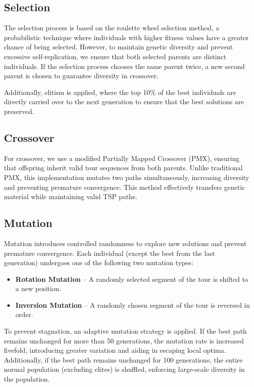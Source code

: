 \documentclass{article}
\begin{document}
\subsection{Selection}
The selection process is based on the roulette wheel selection method, a probabilistic technique where individuals with higher fitness values have a greater chance of being selected. However, to maintain genetic diversity and prevent excessive self-replication, we ensure that both selected parents are distinct individuals. If the selection process chooses the same parent twice, a new second parent is chosen to guarantee diversity in crossover.

Additionally, elitism is applied, where the top 10\% of the best individuals are directly carried over to the next generation to ensure that the best solutions are preserved.

\subsection{Crossover}
For crossover, we use a modified Partially Mapped Crossover (PMX), ensuring that offspring inherit valid tour sequences from both parents. Unlike traditional PMX, this implementation mutates two paths simultaneously, increasing diversity and preventing premature convergence. This method effectively transfers genetic material while maintaining valid TSP paths.

\subsection{Mutation}  
Mutation introduces controlled randomness to explore new solutions and prevent premature convergence. Each individual (except the best from the last generation) undergoes one of the following two mutation types:  

\begin{itemize}  
	\item \textbf{Rotation Mutation} – A randomly selected segment of the tour is shifted to a new position.  
	\item \textbf{Inversion Mutation} – A randomly chosen segment of the tour is reversed in order.  
\end{itemize}  

To prevent stagnation, an adaptive mutation strategy is applied. If the best path remains unchanged for more than 50 generations, the mutation rate is increased fivefold, introducing greater variation and aiding in escaping local optima. Additionally, if the best path remains unchanged for 100 generations, the entire normal population (excluding elites) is shuffled, enforcing large-scale diversity in the population.  
\end{document}
